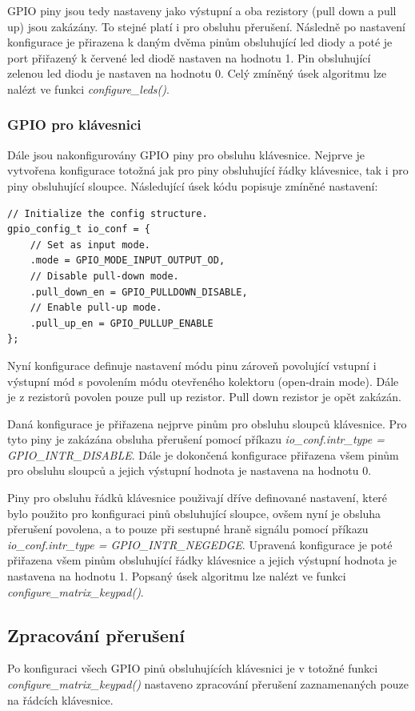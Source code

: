 \documentclass[a4paper, 12pt]{article}
\begin{document}
GPIO piny jsou tedy nastaveny jako výstupní a oba rezistory (pull down a pull up) jsou zakázány. To stejné platí i pro obsluhu přerušení.
Následně po nastavení konfigurace je přirazena k daným dvěma pinům obsluhující led diody a poté je port přiřazený k červené led diodě nastaven na hodnotu 1. Pin obsluhující zelenou led diodu je nastaven na hodnotu 0. Celý zmíněný úsek algoritmu lze nalézt ve funkci \textit{configure\_leds()}.

\subsubsection*{GPIO pro klávesnici}
Dále jsou nakonfigurovány GPIO piny pro obsluhu klávesnice. Nejprve je vytvořena konfigurace totožná jak pro piny obsluhující řádky klávesnice, tak i pro piny obsluhující sloupce. Následující úsek kódu popisuje zmíněné nastavení:

\begin{lstlisting}[style=CLanguage]
// Initialize the config structure.
gpio_config_t io_conf = {                
    // Set as input mode.
    .mode = GPIO_MODE_INPUT_OUTPUT_OD,
    // Disable pull-down mode.
    .pull_down_en = GPIO_PULLDOWN_DISABLE,
    // Enable pull-up mode.
    .pull_up_en = GPIO_PULLUP_ENABLE
};  
\end{lstlisting}

Nyní konfigurace definuje nastavení módu pinu zároveň povolující vstupní i výstupní mód s povolením módu otevřeného kolektoru (open-drain mode). Dále je z rezistorů povolen pouze pull up rezistor. Pull down rezistor je opět zakázán.

Daná konfigurace je přiřazena nejprve pinům pro obsluhu sloupců klávesnice. Pro tyto piny je zakázána obsluha přerušení pomocí příkazu \textit{io\_conf.intr\_type = GPIO\_INTR\_DISABLE}. Dále je dokončená konfigurace přiřazena všem pinům pro obsluhu sloupců a jejich výstupní hodnota je nastavena na hodnotu 0.

Piny pro obsluhu řádků klávesnice použivají dříve definované nastavení, které bylo použito pro konfiguraci pinů obsluhující sloupce, ovšem nyní je obsluha přerušení povolena, a to pouze při sestupné hraně signálu pomocí příkazu \textit{io\_conf.intr\_type = GPIO\_INTR\_NEGEDGE}. Upravená konfigurace je poté přiřazena všem pinům obsluhující řádky klávesnice a jejich výstupní hodnota je nastavena na hodnotu 1. Popsaný úsek algoritmu lze nalézt ve funkci \textit{configure\_matrix\_keypad()}.

\subsection{Zpracování přerušení}
Po konfiguraci všech GPIO pinů obsluhujících klávesnici je v totožné funkci \textit{configure\_matrix\_keypad()} nastaveno zpracování přerušení zaznamenaných pouze na řádcích klávesnice.
\end{document}
